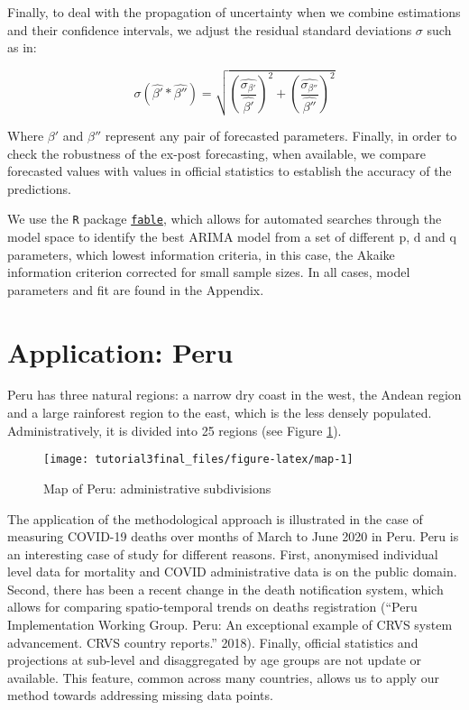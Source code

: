 \documentclass[
]{article}
\begin{document}
Finally, to deal with the propagation of uncertainty when we combine estimations and their confidence intervals, we adjust the residual standard deviations \(\sigma\) such as in:

\begin{equation}
\label{eq:3}
  \sigma(\hat{\beta'} * \hat{\beta''})=\sqrt{(\frac{\hat{\sigma_{\beta'}}}{\hat{\beta'}})^2+
  (\frac{\hat{\sigma_{\beta''}}}{\hat{\beta''}})^2}
\end{equation}

Where \(\beta'\) and \(\beta''\) represent any pair of forecasted parameters. Finally, in order to check the robustness of the ex-post forecasting, when available, we compare forecasted values with values in official statistics to establish the accuracy of the predictions.

We use the \texttt{R} package \href{https://fable.tidyverts.org/}{\texttt{fable}}, which allows for automated searches through the model space to identify the best ARIMA model from a set of different \(\text{p}\), \(\text{d}\) and \(\text{q}\) parameters, which lowest information criteria, in this case, the Akaike information criterion corrected for small sample sizes. In all cases, model parameters and fit are found in the Appendix.

\hypertarget{Peru}{%
\section{Application: Peru}\label{Peru}}

Peru has three natural regions: a narrow dry coast in the west, the Andean region and a large rainforest region to the east, which is the less densely populated. Administratively, it is divided into 25 regions (see Figure \ref{fig:map}).

\begin{figure}[H]

{\centering \texttt{[image: tutorial3final\_files/figure-latex/map-1]} 

}

\caption{Map of Peru: administrative subdivisions}\label{fig:map}
\end{figure}

The application of the methodological approach is illustrated in the case of measuring COVID-19 deaths over months of March to June 2020 in Peru. Peru is an interesting case of study for different reasons. First, anonymised individual level data for mortality and COVID administrative data is on the public domain. Second, there has been a recent change in the death notification system, which allows for comparing spatio-temporal trends on deaths registration (``Peru Implementation Working Group. Peru: An exceptional example of CRVS system advancement. CRVS country reports.'' 2018). Finally, official statistics and projections at sub-level and disaggregated by age groups are not update or available. This feature, common across many countries, allows us to apply our method towards addressing missing data points.
\end{document}
